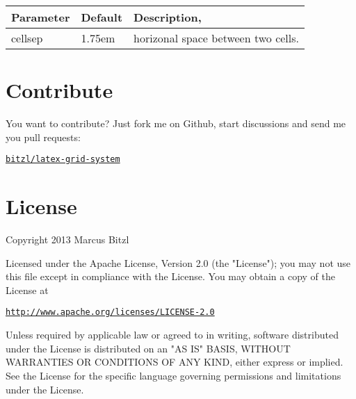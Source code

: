 \documentclass[DIV13]{scrartcl}
\begin{document}
\medskip

\begin{tabularx}{\linewidth}{llX}\toprule
\textbf{Parameter} & \textbf{Default} & \textbf{Description},\\ \midrule
cellsep & 1.75em & horizonal space between two cells.\\\bottomrule
\end{tabularx}

\section{Contribute}
You want to contribute? Just fork me on Github, start discussions and send me you pull requests: 
\begin{center}
	\href{https://github.com/bitzl/latex-grid-system}{\tt bitzl/latex-grid-system}
\end{center}
	


\section{License}
Copyright 2013 Marcus Bitzl

\medskip

Licensed under the Apache License, Version 2.0 (the "License");
you may not use this file except in compliance with the License.
You may obtain a copy of the License at

\medskip

\hspace*{1.2em}\href{http://www.apache.org/licenses/LICENSE-2.0}{\texttt{http://www.apache.org/licenses/LICENSE-2.0}}

\medskip

Unless required by applicable law or agreed to in writing, software
distributed under the License is distributed on an "AS IS" BASIS,
WITHOUT WARRANTIES OR CONDITIONS OF ANY KIND, either express or implied.
See the License for the specific language governing permissions and
limitations under the License.
\end{document}
